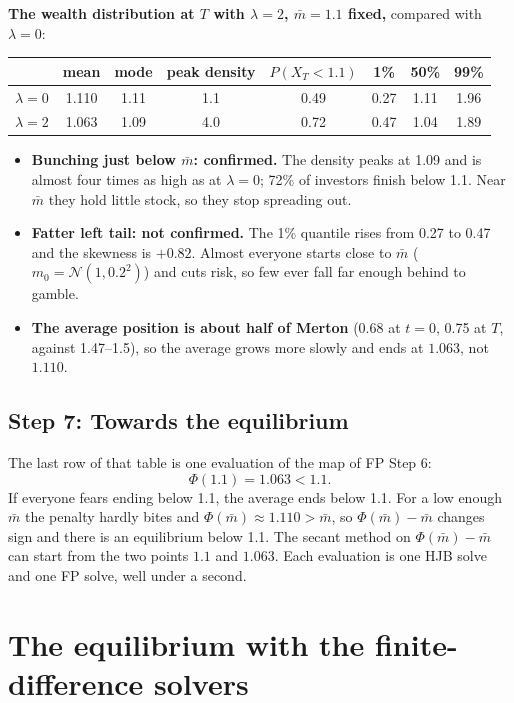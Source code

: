 \documentclass[11pt]{article}
\newcommand{\mb}{\bar m}
\begin{document}
\textbf{The wealth distribution at $T$ with $\lambda=2$, $\mb=1.1$ fixed,} compared with
$\lambda=0$:
\begin{center}
\small
\begin{tabular}{@{}lccccccc@{}}
\toprule
 & mean & mode & peak density & $P(X_T<1.1)$ & 1\% & 50\% & 99\% \\
\midrule
$\lambda=0$ & 1.110 & 1.11 & 1.1 & 0.49 & 0.27 & 1.11 & 1.96 \\
$\lambda=2$ & 1.063 & 1.09 & 4.0 & 0.72 & 0.47 & 1.04 & 1.89 \\
\bottomrule
\end{tabular}
\end{center}
\begin{itemize}
  \item \textbf{Bunching just below $\mb$: confirmed.} The density peaks at 1.09 and is almost
        four times as high as at $\lambda=0$; 72\% of investors finish below 1.1. Near $\mb$
        they hold little stock, so they stop spreading out.
  \item \textbf{Fatter left tail: not confirmed.} The 1\% quantile rises from 0.27 to 0.47 and
        the skewness is $+0.82$. Almost everyone starts close to $\mb$ ($m_0=\mathcal
        N(1,0.2^2)$) and cuts risk, so few ever fall far enough behind to gamble.
  \item \textbf{The average position is about half of Merton} (0.68 at $t=0$, 0.75 at $T$,
        against 1.47--1.5), so the average grows more slowly and ends at $1.063$, not $1.110$.
\end{itemize}

\subsection*{Step 7: Towards the equilibrium}
The last row of that table is one evaluation of the map of FP Step 6:
\[
  \Phi(1.1) = 1.063 < 1.1 .
\]
If everyone fears ending below 1.1, the average ends below 1.1. For a low enough $\mb$ the
penalty hardly bites and $\Phi(\mb)\approx1.110>\mb$, so $\Phi(\mb)-\mb$ changes sign and there
is an equilibrium below 1.1. The secant method on $\Phi(\mb)-\mb$ can start from the two points
$1.1$ and $1.063$. Each evaluation is one HJB solve and one FP solve, well under a second.

\section{The equilibrium with the finite-difference solvers}
\label{app:fd-eq}
\end{document}
